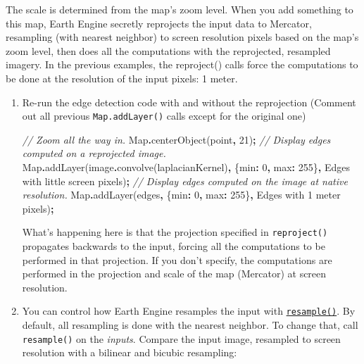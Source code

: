 \documentclass[
]{article}
\newenvironment{Shaded}{\begin{snugshade}}{\end{snugshade}}
\newcommand{\BuiltInTok}[1]{#1}
\newcommand{\CommentTok}[1]{\textcolor[rgb]{0.56,0.35,0.01}{\textit{#1}}}
\newcommand{\DataTypeTok}[1]{\textcolor[rgb]{0.13,0.29,0.53}{#1}}
\newcommand{\DecValTok}[1]{\textcolor[rgb]{0.00,0.00,0.81}{#1}}
\newcommand{\FunctionTok}[1]{\textcolor[rgb]{0.00,0.00,0.00}{#1}}
\newcommand{\NormalTok}[1]{#1}
\newcommand{\OperatorTok}[1]{\textcolor[rgb]{0.81,0.36,0.00}{\textbf{#1}}}
\newcommand{\StringTok}[1]{\textcolor[rgb]{0.31,0.60,0.02}{#1}}
\begin{document}
The scale is determined from the map's zoom level. When you add something to this map, Earth Engine secretly reprojects the input data to Mercator, resampling (with nearest neighbor) to screen resolution pixels based on the map's zoom level, then does all the computations with the reprojected, resampled imagery. In the previous examples, the reproject() calls force the computations to be done at the resolution of the input pixels: 1 meter.

\begin{enumerate}
\def\labelenumi{\arabic{enumi}.}
\item
  Re-run the edge detection code with and without the reprojection (Comment out all previous \texttt{Map.addLayer()} calls except for the original one)

\begin{Shaded}
\begin{Highlighting}[]
\CommentTok{// Zoom all the way in.}
\BuiltInTok{Map}\OperatorTok{.}\FunctionTok{centerObject}\NormalTok{(point}\OperatorTok{,} \DecValTok{21}\NormalTok{)}\OperatorTok{;}
\CommentTok{// Display edges computed on a reprojected image.}
\BuiltInTok{Map}\OperatorTok{.}\FunctionTok{addLayer}\NormalTok{(image}\OperatorTok{.}\FunctionTok{convolve}\NormalTok{(laplacianKernel)}\OperatorTok{,}\NormalTok{ \{}\DataTypeTok{min}\OperatorTok{:} \DecValTok{0}\OperatorTok{,} \DataTypeTok{max}\OperatorTok{:} \DecValTok{255}\NormalTok{\}}\OperatorTok{,} 
       \StringTok{\textquotesingle{}Edges with little screen pixels\textquotesingle{}}\NormalTok{)}\OperatorTok{;}
\CommentTok{// Display edges computed on the image at native resolution.}
\BuiltInTok{Map}\OperatorTok{.}\FunctionTok{addLayer}\NormalTok{(edges}\OperatorTok{,}\NormalTok{ \{}\DataTypeTok{min}\OperatorTok{:} \DecValTok{0}\OperatorTok{,} \DataTypeTok{max}\OperatorTok{:} \DecValTok{255}\NormalTok{\}}\OperatorTok{,} 
       \StringTok{\textquotesingle{}Edges with 1 meter pixels\textquotesingle{}}\NormalTok{)}\OperatorTok{;} 
\end{Highlighting}
\end{Shaded}

  What's happening here is that the projection specified in \texttt{reproject()} propagates backwards to the input, forcing all the computations to be performed in that projection. If you don't specify, the computations are performed in the projection and scale of the map (Mercator) at screen resolution.
\item
  You can control how Earth Engine resamples the input with \href{https://developers.google.com/earth-engine/guides/resample}{\texttt{resample()}}. By default, all resampling is done with the nearest neighbor. To change that, call \texttt{resample()} on the \emph{inputs}. Compare the input image, resampled to screen resolution with a bilinear and bicubic resampling:


\end{enumerate}
\end{document}
